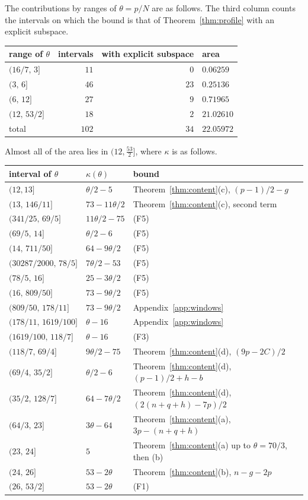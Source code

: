 \documentclass[11pt]{amsart}
\newcommand{\Chi}{22.05972}
\theoremstyle{definition}
\theoremstyle{remark}
\numberwithin{equation}{section}
\begin{document}
The contributions by ranges of $\theta=p/N$ are as follows. The third column counts the intervals on which
the bound is that of Theorem~\ref{thm:profile} with an explicit subspace.
\begin{center}
\begin{tabular}{@{}lrrl@{}}
\toprule
range of $\theta$ & intervals & with explicit subspace & area \\
\midrule
$(16/7,\,3]$ & $11$ & $0$ & $0.06259$ \\
$(3,\,6]$ & $46$ & $23$ & $0.25136$ \\
$(6,\,12]$ & $27$ & $9$ & $0.71965$ \\
$(12,\,53/2]$ & $18$ & $2$ & $21.02610$ \\
\midrule
total & $102$ & $34$ & $\Chi$ \\
\bottomrule
\end{tabular}
\end{center}
Almost all of the area lies in $(12,\frac{53}2]$, where $\kappa$ is as follows.
\begin{center}
\begin{tabular}{@{}lll@{}}
\toprule
interval of $\theta$ & $\kappa(\theta)$ & bound \\
\midrule
$(12,13]$ & $\theta/2-5$ & Theorem~\ref{thm:content}(c), $(p-1)/2-g$ \\
$(13,\,146/11]$ & $73-11\theta/2$ & Theorem~\ref{thm:content}(c), second term \\
$(341/25,\,69/5]$ & $11\theta/2-75$ & (F5) \\
$(69/5,\,14]$ & $\theta/2-6$ & (F5) \\
$(14,\,711/50]$ & $64-9\theta/2$ & (F5) \\
$(30287/2000,\,78/5]$ & $7\theta/2-53$ & (F5) \\
$(78/5,\,16]$ & $25-3\theta/2$ & (F5) \\
$(16,\,809/50]$ & $73-9\theta/2$ & (F5) \\
$(809/50,\,178/11]$ & $73-9\theta/2$ & Appendix~\ref{app:windows} \\
$(178/11,\,1619/100]$ & $\theta-16$ & Appendix~\ref{app:windows} \\
$(1619/100,\,118/7]$ & $\theta-16$ & (F3) \\
$(118/7,\,69/4]$ & $9\theta/2-75$ & Theorem~\ref{thm:content}(d), $(9p-2C)/2$ \\
$(69/4,\,35/2]$ & $\theta/2-6$ & Theorem~\ref{thm:content}(d), $(p-1)/2+h-b$ \\
$(35/2,\,128/7]$ & $64-7\theta/2$ & Theorem~\ref{thm:content}(d), $(2(n+q+h)-7p)/2$ \\
$(64/3,\,23]$ & $3\theta-64$ & Theorem~\ref{thm:content}(a), $3p-(n+q+h)$ \\
$(23,\,24]$ & $5$ & Theorem~\ref{thm:content}(a) up to $\theta=70/3$, then (b) \\
$(24,\,26]$ & $53-2\theta$ & Theorem~\ref{thm:content}(b), $n-g-2p$ \\
$(26,\,53/2]$ & $53-2\theta$ & (F1) \\
\bottomrule
\end{tabular}
\end{center}
\end{document}

